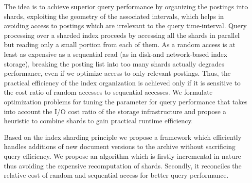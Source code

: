 The idea is to achieve superior query performance by organizing the postings into shards, exploiting the geometry of the associated intervals, which helps in avoiding access to postings which are irrelevant to the query time-interval. Query processing over a sharded index proceeds by accessing all 
the shards in parallel but reading only a small portion from each of them. As a random access is at least as expensive as a 
sequential read (as in disk-and network-based index storage), breaking 
the posting list into too many shards actually degrades performance, even if we optimize access to only relevant postings. Thus, the practical 
efficiency of the index organization is achieved only if it is 
sensitive to the cost ratio of random accesses to sequential accesses. 
We formulate optimization problems for tuning the parameter for 
query performance that takes into account the I/O cost ratio of the 
storage infrastructure and propose a heuristic to combine shards to 
gain practical runtime efficiency. 



Based on the index sharding principle we propose a framework which efficiently handles additions of new document versions to the
archive without sacrificing query efficiency. We propose an algorithm which is firstly incremental in nature thus avoiding the expensive recomputation of shards. Secondly, it reconciles the relative cost of random and sequential access for better query performance. 

